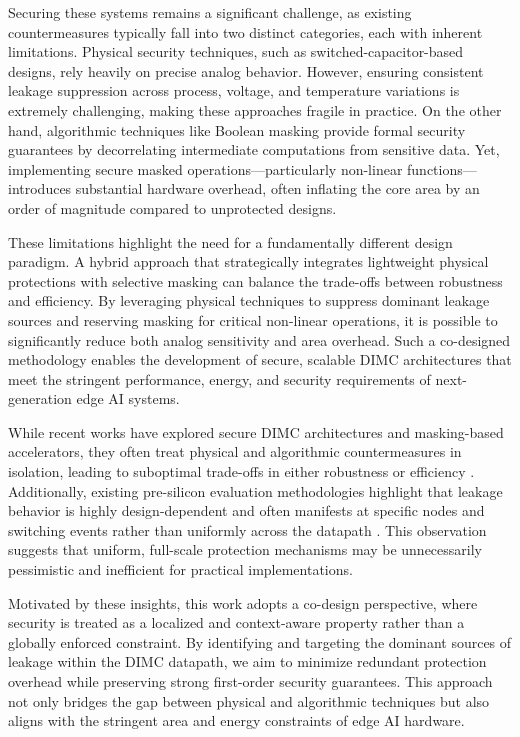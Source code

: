 \documentclass[journal]{IEEEtran}
\begin{document}
Securing these systems remains a significant challenge, as existing countermeasures typically fall into two distinct categories, each with inherent limitations. Physical security techniques, such as switched-capacitor-based designs, rely heavily on precise analog behavior. However, ensuring consistent leakage suppression across process, voltage, and temperature variations is extremely challenging, making these approaches fragile in practice. On the other hand, algorithmic techniques like Boolean masking provide formal security guarantees by decorrelating intermediate computations from sensitive data. Yet, implementing secure masked operations—particularly non-linear functions—introduces substantial hardware overhead, often inflating the core area by an order of magnitude compared to unprotected designs.

These limitations highlight the need for a fundamentally different design paradigm. A hybrid approach that strategically integrates lightweight physical protections with selective masking can balance the trade-offs between robustness and efficiency. By leveraging physical techniques to suppress dominant leakage sources and reserving masking for critical non-linear operations, it is possible to significantly reduce both analog sensitivity and area overhead. Such a co-designed methodology enables the development of secure, scalable DIMC architectures that meet the stringent performance, energy, and security requirements of next-generation edge AI systems.

While recent works have explored secure DIMC architectures and masking-based accelerators, they often treat physical and algorithmic countermeasures in isolation, leading to suboptimal trade-offs in either robustness or efficiency \cite{ashok2024, maji2022}. Additionally, existing pre-silicon evaluation methodologies highlight that leakage behavior is highly design-dependent and often manifests at specific nodes and switching events rather than uniformly across the datapath \cite{bepary2024, woudenberg2023, pundir2022, bokharaie2022}. This observation suggests that uniform, full-scale protection mechanisms may be unnecessarily pessimistic and inefficient for practical implementations.

Motivated by these insights, this work adopts a co-design perspective, where security is treated as a localized and context-aware property rather than a globally enforced constraint. By identifying and targeting the dominant sources of leakage within the DIMC datapath, we aim to minimize redundant protection overhead while preserving strong first-order security guarantees. This approach not only bridges the gap between physical and algorithmic techniques but also aligns with the stringent area and energy constraints of edge AI hardware.
\end{document}
